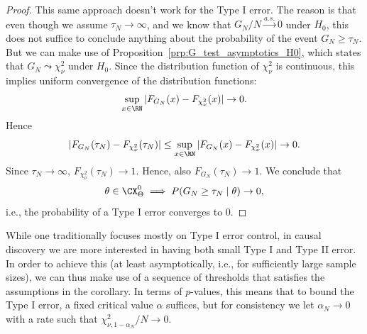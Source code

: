 \begin{proof}
This same approach doesn't work for the Type I error. The reason is that even though
we assume $\tau_N \to \infty$, and we know that $G_N / N \stackrel{a.s.}{\to} 0$ 
under $H_0$,
this does not suffice to conclude anything about the probability of the event 
$G_N \ge \tau_N$. But we can make use of Proposition~\ref{prp:G_test_asymptotics_H0},
which states that $G_N \leadsto \chi_{\nu}^2$ under $H_0$. 
Since the distribution function of $\chi_{\nu}^2$ is continuous,
this implies uniform convergence of the distribution functions:
  $$\sup_{x \in \RN} |F_{G_N}(x) - F_{\chi_{\nu}^2}(x)| \to 0.$$
Hence
  $$|F_{G_N}(\tau_N) - F_{\chi_{\nu}^2}(\tau_N)| \le \sup_{x\in\RN} |F_{G_N}(x) - F_{\chi_{\nu}^2}(x)| \to 0.$$
Since $\tau_N \to \infty$, $F_{\chi_{\nu}^2}(\tau_N) \to 1$.
Hence, also $F_{G_N}(\tau_N) \to 1$.
We conclude that 
  $$\theta \in \CX_\Theta^0 \implies P(G_N \ge \tau_N \mid \theta) \to 0,$$
i.e., the probability of a Type I error converges to 0.
\end{proof}

While one traditionally focuses mostly on Type I error control, in causal discovery we
are more interested in having both small Type I and Type II error. In order to achieve this
(at least asymptotically, i.e., for sufficiently large sample sizes), we can thus make use of a sequence of
thresholds that satisfies the assumptions in the corollary. In terms of $p$-values, this means
that to bound the Type I error, a fixed critical value $\alpha$ suffices, but for consistency we
let $\alpha_N \to 0$ with a rate such that $\chi^2_{\nu,1-\alpha_N} / N \to 0$.

